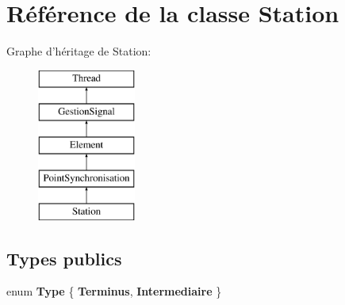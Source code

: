 \hypertarget{classStation}{
\section{Référence de la classe Station}
\label{classStation}
}
Graphe d'héritage de Station:\begin{figure}[H]
\begin{center}
\leavevmode
\includegraphics[height=5cm]{classStation}
\end{center}
\end{figure}
\subsection*{Types publics}
\begin{DoxyCompactItemize}
\item 
enum {\bfseries Type} \{ {\bfseries Terminus}, 
{\bfseries Intermediaire}
 \}
\end{DoxyCompactItemize}
